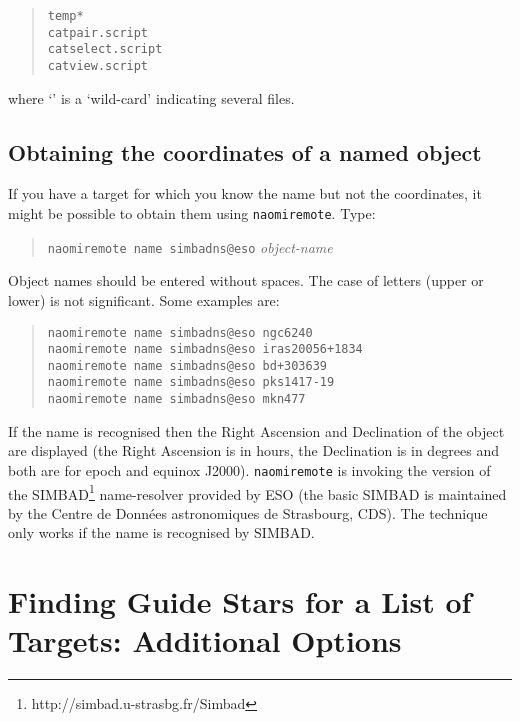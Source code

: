 \documentclass[twoside,11pt]{article}
\newcommand{\htmladdnormallinkfoot}[2]{#1\footnote{#2}}
\newcommand{\htmladdnormallink}[2]{#1}
\newcommand{\xlabel}[1]{}
\renewcommand{\_}{\texttt{\symbol{95}}}
\begin{document}
\begin{quote}
{\tt temp*       \\
catpair.script   \\
catselect.script \\
catview.script}
\end{quote}

where `{\tt *}' is a `wild-card' indicating several files.

\subsection{\label{NAME}Obtaining the coordinates of a named object}

If you have a target for which you know the name but not the coordinates,
it might be possible to obtain them using {\tt naomiremote}.  Type:

\begin{quote}
{\tt naomiremote name simbad\_ns@eso} {\it object-name}
\end{quote}

Object names should be entered without spaces.  The case of letters
(upper or lower) is not significant.  Some examples are:

\begin{quote}
{\tt naomiremote name simbad\_ns@eso ngc6240   \\
naomiremote name simbad\_ns@eso iras20056+1834 \\
naomiremote name simbad\_ns@eso bd+303639 \\
naomiremote name simbad\_ns@eso pks1417-19 \\
naomiremote name simbad\_ns@eso mkn477}
\end{quote}

If the name is recognised then the Right Ascension and Declination of the
object are displayed (the Right Ascension is in hours, the Declination is
in degrees and both are for epoch and equinox J2000).  {\tt naomiremote}
is invoking the version of the
\htmladdnormallinkfoot{SIMBAD}{http://simbad.u-strasbg.fr/Simbad}
name-resolver provided by ESO (the basic SIMBAD is maintained by the
\htmladdnormallink{Centre de Donn\'{e}es astronomiques de Strasbourg}
{http://cdsweb.u-strasbg.fr/CDS.html}, CDS).  The technique only works
if the name is recognised by SIMBAD.

\newpage
\section{\xlabel{ADDOPT}\label{ADDOPT}Finding Guide Stars for a List of
Targets: Additional Options}
\end{document}
